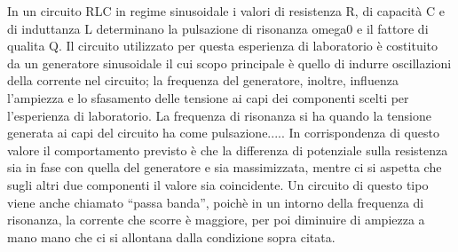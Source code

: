 In un circuito RLC in regime sinusoidale i valori di resistenza R, di capacità C e di induttanza L determinano la pulsazione di risonanza omega0 e il fattore di qualita Q.
Il circuito utilizzato per questa esperienza di laboratorio è costituito da un generatore sinusoidale il cui scopo principale è quello di indurre oscillazioni della corrente nel circuito; la frequenza del generatore, inoltre, influenza l’ampiezza e lo sfasamento delle tensione ai capi dei componenti scelti per l’esperienza di laboratorio.
La frequenza di risonanza si ha quando la tensione generata ai capi del circuito ha come pulsazione.....
In corrispondenza di questo valore il comportamento previsto è che la differenza di potenziale sulla resistenza sia in fase con quella del generatore e sia massimizzata, mentre ci si aspetta che  sugli altri due componenti il valore sia coincidente.
Un circuito di questo tipo viene anche chiamato “passa banda”, poichè in un intorno della frequenza di risonanza, la corrente che scorre è maggiore, per poi diminuire di ampiezza a mano mano che ci si allontana dalla condizione sopra citata.
